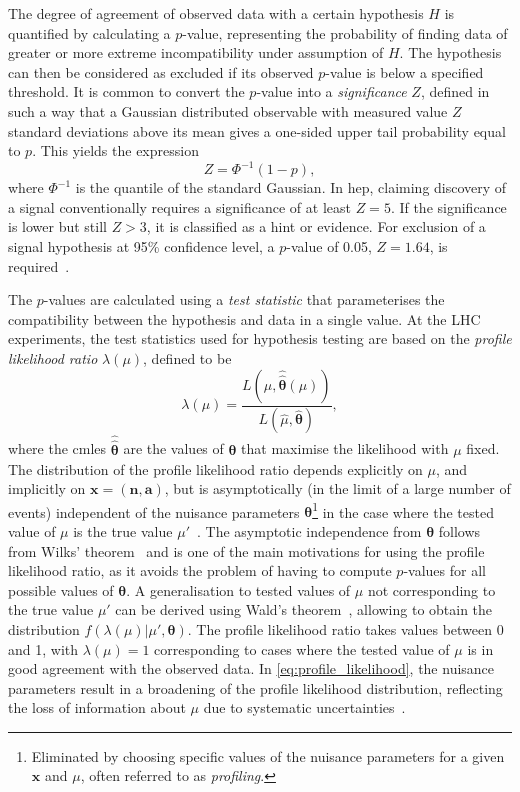The degree of agreement of observed data with a certain hypothesis $H$ is quantified by calculating a $p$-value, representing the probability of finding data of greater or more extreme incompatibility under assumption of $H$. The hypothesis can then be considered as excluded if its observed $p$-value is below a specified threshold. It is common to convert the $p$-value into a \textit{significance} $Z$, defined in such a way that a Gaussian distributed observable with measured value $Z$ standard deviations above its mean gives a one-sided upper tail probability equal to $p$. This yields the expression
\begin{equation}
	Z = \Phi^{-1}(1-p),
	\label{eq:significance}
\end{equation}
where $\Phi^{-1}$ is the quantile of the standard Gaussian. In \gls{hep}, claiming discovery of a signal conventionally requires a significance of at least $Z=5$. If the significance is lower but still $Z>3$, it is classified as a hint or evidence. For exclusion of a signal hypothesis at 95\% confidence level, a $p$-value of 0.05, \ie $Z = 1.64$, is required~\cite{Cowan:2010js}. 

The $p$-values are calculated using a \textit{test statistic} that parameterises the compatibility between the hypothesis and data in a single value. At the LHC experiments, the test statistics used for hypothesis testing are based on the \textit{profile likelihood ratio} $\lambda(\mu)$, defined to be
\begin{equation}
	\lambda(\mu) = \frac{L(\mu,\boldsymbol{\hat{\hat{\theta}}}(\mu))}{L(\hat{\mu},\hat{\boldsymbol{\theta}})},
	\label{eq:profile_likelihood}
\end{equation}
where the \glspl{cmle} $\boldsymbol{\hat{\hat{\theta}}}$ are the values of $\boldsymbol{\theta}$ that maximise the likelihood with $\mu$ fixed. The distribution of the profile likelihood ratio depends explicitly on $\mu$, and implicitly on $\boldsymbol{x} = (\boldsymbol{n},\boldsymbol{a})$, but is asymptotically  (\ie in the limit of a large number of events) independent of the nuisance parameters $\boldsymbol{\theta}$\footnote{Eliminated by choosing specific values of the nuisance parameters for a given $\boldsymbol{x}$ and $\mu$, often referred to as \textit{profiling}.} in the case where the tested value of $\mu$ is the true value $\mu'$~\cite{Cranmer:2015nia}. The asymptotic independence from $\boldsymbol{\theta}$ follows from Wilks' theorem~\cite{wilks1938} and is one of the main motivations for using the profile likelihood ratio, as it avoids the problem of having to compute $p$-values for all possible values of $\boldsymbol{\theta}$. A generalisation to tested values of $\mu$ not corresponding to the true value $\mu'$ can be derived using Wald's theorem~\cite{wald10.2307/1990256}, allowing to obtain the distribution $f(\lambda(\mu)\vert \mu',\boldsymbol{\theta})$. The profile likelihood ratio takes values between 0 and 1, with $\lambda(\mu) = 1$ corresponding to cases where the tested value of $\mu$ is in good agreement with the observed data. In \cref{eq:profile_likelihood}, the nuisance parameters result in a broadening of the profile likelihood distribution, reflecting the loss of information about $\mu$ due to systematic uncertainties~\cite{Cowan:2010js}.

